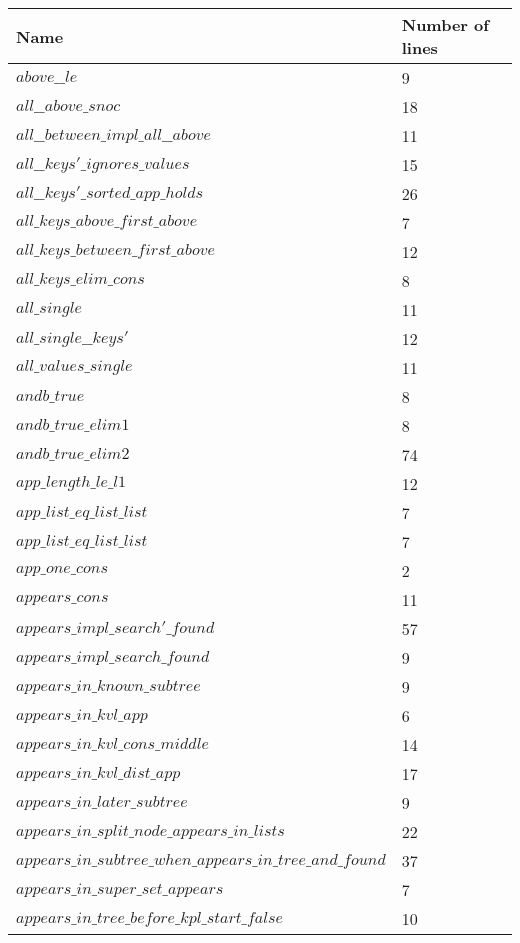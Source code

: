 \begin{tabular}{| l | l |}
\hline
Name & Number of lines \\ \hline
$above\_\_le$ & 9 \\ \hline
$all\_\_above\_snoc$ & 18 \\ \hline
$all\_\_between\_impl\_all\_\_above$ & 11 \\ \hline
$all\_\_keys'\_ignores\_values$ & 15 \\ \hline
$all\_\_keys'\_sorted\_app\_holds$ & 26 \\ \hline
$all\_keys\_above\_first\_above$ & 7 \\ \hline
$all\_keys\_between\_first\_above$ & 12 \\ \hline
$all\_keys\_elim\_cons$ & 8 \\ \hline
$all\_single$ & 11 \\ \hline
$all\_single\_\_keys'$ & 12 \\ \hline
$all\_values\_single$ & 11 \\ \hline
$andb\_true$ & 8 \\ \hline
$andb\_true\_elim1$ & 8 \\ \hline
$andb\_true\_elim2$ & 74 \\ \hline
$app\_length\_le\_l1$ & 12 \\ \hline
$app\_list\_eq\_list\_list$ & 7 \\ \hline
$app\_list\_eq\_list\_list$ & 7 \\ \hline
$app\_one\_cons$ & 2 \\ \hline
$appears\_cons$ & 11 \\ \hline
$appears\_impl\_search'\_found$ & 57 \\ \hline
$appears\_impl\_search\_found$ & 9 \\ \hline
$appears\_in\_known\_subtree$ & 9 \\ \hline
$appears\_in\_kvl\_app$ & 6 \\ \hline
$appears\_in\_kvl\_cons\_middle$ & 14 \\ \hline
$appears\_in\_kvl\_dist\_app$ & 17 \\ \hline
$appears\_in\_later\_subtree$ & 9 \\ \hline
$appears\_in\_split\_node\_appears\_in\_lists$ & 22 \\ \hline
$appears\_in\_subtree\_when\_appears\_in\_tree\_and\_found$ & 37 \\ \hline
$appears\_in\_super\_set\_appears$ & 7 \\ \hline
$appears\_in\_tree\_before\_kpl\_start\_false$ & 10 \\ \hline

\end{tabular}
